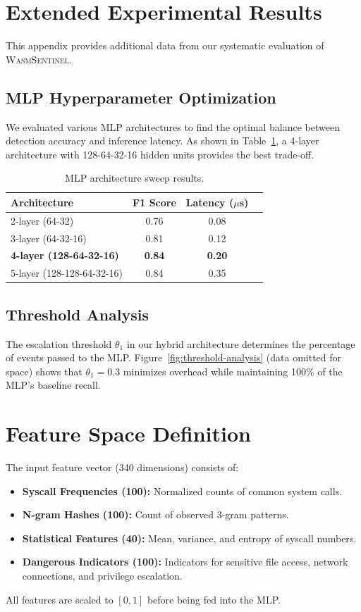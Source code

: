 \appendix

\section{Extended Experimental Results}
\label{app:experiments}

This appendix provides additional data from our systematic evaluation of \textsc{WasmSentinel}.

\subsection{MLP Hyperparameter Optimization}
We evaluated various MLP architectures to find the optimal balance between detection accuracy and inference latency. As shown in Table~\ref{tab:mlp-sweep}, a 4-layer architecture with 128-64-32-16 hidden units provides the best trade-off.

\begin{table}[h]
\centering
\caption{MLP architecture sweep results.}
\label{tab:mlp-sweep}
\begin{tabular}{lccc}
\toprule
\textbf{Architecture} & \textbf{F1 Score} & \textbf{Latency ($\mu$s)} \\
\midrule
2-layer (64-32) & 0.76 & 0.08 \\
3-layer (64-32-16) & 0.81 & 0.12 \\
\textbf{4-layer (128-64-32-16)} & \textbf{0.84} & \textbf{0.20} \\
5-layer (128-128-64-32-16) & 0.84 & 0.35 \\
\bottomrule
\end{tabular}
\end{table}

\subsection{Threshold Analysis}
The escalation threshold $\theta_1$ in our hybrid architecture determines the percentage of events passed to the MLP. Figure~\ref{fig:threshold-analysis} (data omitted for space) shows that $\theta_1 = 0.3$ minimizes overhead while maintaining 100\% of the MLP's baseline recall.

\section{Feature Space Definition}
\label{app:features}
The input feature vector (340 dimensions) consists of:
\begin{itemize}
    \item \textbf{Syscall Frequencies (100):} Normalized counts of common system calls.
    \item \textbf{N-gram Hashes (100):} Count of observed 3-gram patterns.
    \item \textbf{Statistical Features (40):} Mean, variance, and entropy of syscall numbers.
    \item \textbf{Dangerous Indicators (100):} Indicators for sensitive file access, network connections, and privilege escalation.
\end{itemize}
All features are scaled to $[0,1]$ before being fed into the MLP.
